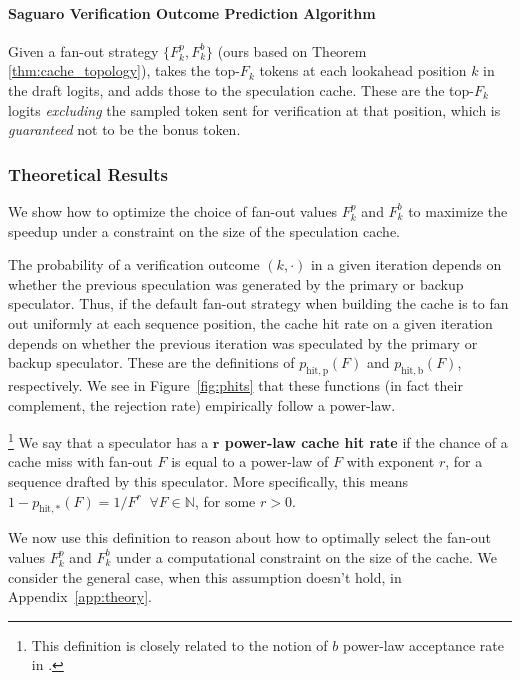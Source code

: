 \paragraph{Saguaro Verification Outcome Prediction Algorithm}

Given a fan-out strategy $\{F_k^p, F_k^b\}$ (ours based on Theorem \ref{thm:cache_topology}), \Sys takes the top-$F_k$ tokens at each lookahead position $k$ in the draft logits, and adds those to the speculation cache.
These are the top-$F_k$ logits \textit{excluding} the sampled token sent for verification at that position, which is \textit{guaranteed} not to be the bonus token.


\subsubsection{Theoretical Results}
\label{sec:cache_topology_theory}
We show how to optimize the choice of fan-out values $F_k^p$ and $F_k^b$ to maximize the speedup under a constraint on the size of the speculation cache.


The probability of a verification outcome $(k, \cdot)$ in a given iteration depends on whether the previous speculation was generated by the primary or backup speculator. 
Thus, if the default fan-out strategy when building the cache is to fan out uniformly at each sequence position, the cache hit rate on a given iteration depends on whether the previous iteration was speculated by the primary or backup speculator. 
These are the definitions of $p_{\mathrm{hit,p}}(F)$ and $p_{\mathrm{hit,b}}(F)$, respectively. 
We see in Figure~\ref{fig:phits} that these functions (in fact their complement, the rejection rate) empirically follow a power-law. 

\begin{definition}\hspace{-0.05in}\footnote{
        This definition is closely related to the notion of $b$ power-law acceptance rate in \cite{sequoia}.
    }
    \;We say that a speculator has a \textbf{$\mathbf{r}$ power-law cache hit rate} if the chance of a cache miss with fan-out $F$ is equal to a power-law of $F$ with exponent $r$, for a sequence drafted by this speculator.
    More specifically, this means $1-p_{\mathrm{hit,*}}(F) = 1/F^r \;\; \forall F \in \mathbb{N}$, for some $r > 0$.
\end{definition}

We now use this definition to reason about how to optimally select the fan-out values $F_k^p$ and $F_k^b$ under a computational constraint on the size of the cache. 
We consider the general case, when this assumption doesn't hold, in Appendix~\ref{app:theory}.

